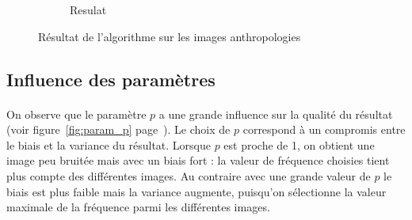 \documentclass[a4paper,10pt]{report}
\begin{document}
\begin{figure}[h]
\begin{subfigure}{0.32\textwidth}
    \caption{Resulat}
    \label{fig:fire_result}
  \end{subfigure}
  
  \caption{Résultat de l'algorithme sur les images anthropologies}
\label{fig:anthro}
\end{figure}

\subsection{Influence des paramètres}
\paragraph{}
On observe que le paramètre \(p\) a une grande influence sur la qualité du résultat (voir
figure~\ref{fig:param_p} page~\pageref{fig:param_p}).
Le choix de \(p\) correspond à un compromis entre le biais et la variance du résultat. 
Lorsque \(p\) est proche de 1, on obtient une image peu bruitée mais avec un biais fort : la valeur 
de fréquence choisies tient plus compte des différentes images.
Au contraire avec une grande valeur de \(p\) le biais est plus faible mais la variance augmente,
puisqu'on sélectionne la valeur maximale de la fréquence parmi les différentes images.
\end{document}
